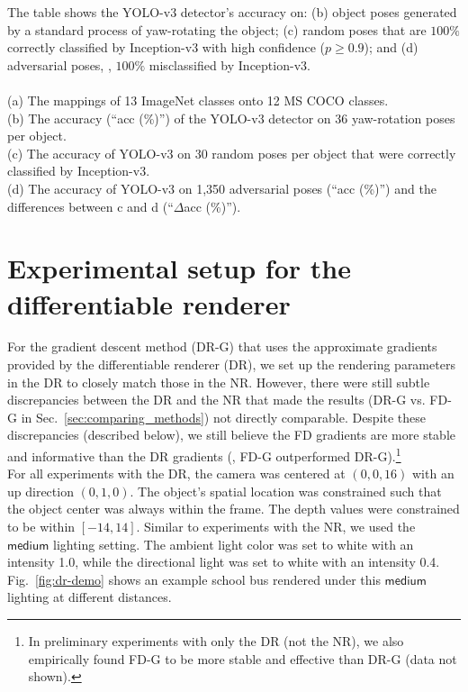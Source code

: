 \documentclass[10pt,twocolumn,letterpaper]{article}
\newcommand{\subsec}[1]{\noindent{\textbf{#1.}}}
\newcommand{\medium}{\ensuremath{\mathsf{medium}}\xspace}
\begin{document}
\begin{table*}
{		The table shows the YOLO-v3 detector's accuracy on: (b) object poses generated by a standard process of yaw-rotating the object; (c) random poses that are $100\%$ correctly classified by Inception-v3 with high confidence ($p \geq 0.9$); and (d) adversarial poses, \ie, $100\%$ misclassified by Inception-v3.\\\\
		(a) The mappings of 13 ImageNet classes onto 12 MS COCO classes.\\
		(b) The accuracy (``acc (\%)'') of the YOLO-v3 detector on 36 yaw-rotation poses per object.\\
		(c) The accuracy of YOLO-v3 on 30 random poses per object that were correctly classified by Inception-v3.\\
		(d) The accuracy of YOLO-v3 on 1,350 adversarial poses (``acc (\%)'') and the differences between c and d (``$\Delta$acc (\%)'').
	}
	\label{tab:yolo_transfer_stats}
\end{table*}

\clearpage












\section{Experimental setup for the differentiable renderer}\label{sec:dr-expr}

For the gradient descent method (DR-G) that uses the approximate gradients provided by the differentiable renderer \cite{kato2018neural} (DR), we set up the rendering parameters in the DR to closely match those in the NR.
However, there were still subtle discrepancies between the DR and the NR that made the results (DR-G vs. FD-G in Sec.~\ref{sec:comparing_methods}) not directly comparable.
Despite these discrepancies (described below), we still believe the FD gradients are more stable and informative than the DR gradients (\ie, FD-G outperformed DR-G).\footnote{In preliminary experiments with only the DR (not the NR), we also empirically found FD-G to be more stable and effective than DR-G (data not shown).}\\

\subsec{DR setup} 
For all experiments with the DR, the camera was centered at \((0, 0, 16)\) with an up direction \((0, 1, 0)\). 
The object's spatial location was constrained such that the object center was always within the frame.
The depth values were constrained to be within \([-14, 14]\).
Similar to experiments with the NR, we used the \medium lighting setting.
The ambient light color was set to white with an intensity 1.0, while the directional light was set to white with an intensity 0.4.  
Fig.~\ref{fig:dr-demo} shows an example school bus rendered under this \medium lighting at different distances.
\end{document}
